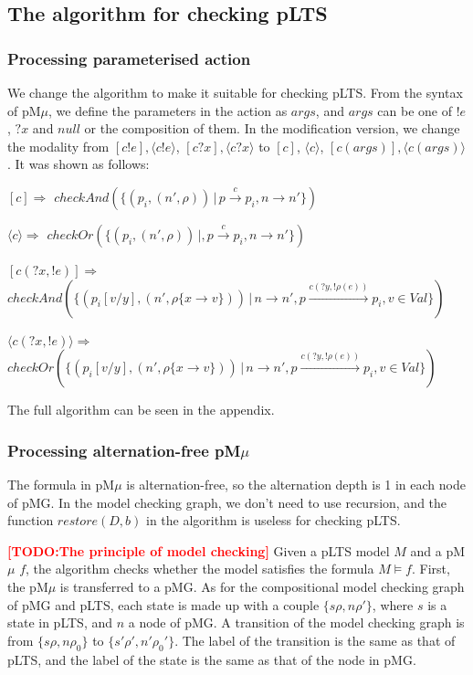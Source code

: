 \documentclass[runningheads,a4paper]{llncs}
\newcommand{\TODO}[1]{\textcolor{red}{\textbf{[TODO:#1]}}}
\begin{document}
\subsection{The algorithm for checking pLTS}


\subsubsection{Processing parameterised action}
We change the algorithm to make it suitable for checking pLTS. From the syntax of pM$\mu$, we define the parameters in the action as $args$, and $args$ can be one of $!e$, $?x$ and $null$ or the composition of them. In the modification version, we change the modality from $[c!e], \langle c!e\rangle$, $[c?x], \langle c?x\rangle$ to $[c]$, $\langle c\rangle$, $[c(args)], \langle c(args)\rangle$.
It was shown as follows:

$[c]\Rightarrow$ $checkAnd(\{ (p_{i}, (n', \rho))\,|\, p \xrightarrow{c} p_{i}, n\rightarrow n' \})$
		
$\langle c\rangle\Rightarrow$ 
	 $checkOr(\{ (p_{i}, (n',\rho))\,|, p \xrightarrow{c} p_{i}, n \rightarrow n'\})$
		
$[c(?x, !e)]\Rightarrow$
	$ checkAnd(\{ (p_{i}[v/y], (n',\rho\{x \rightarrow v\}))\,|\,  n \rightarrow n', p \xrightarrow{c(?y, !\rho(e)) } p_{i},v\in Val\})$
		
{$\langle c(?x, !e)\rangle\Rightarrow$}
	 $ checkOr(\{ (p_{i}[v/y], (n', \rho\{x \rightarrow v\}))\,|\,  n \rightarrow n', p \xrightarrow{c(?y, !\rho(e))} p_{i},v\in Val\})$
		
The full algorithm can be seen in the appendix.

\subsubsection{Processing alternation-free pM$\mu$}
The formula in pM$\mu$ is alternation-free, so the alternation depth is 1 in each node of pMG. In the model checking graph, we don't need to use recursion, and the function $restore(D, b)$ in the algorithm is useless for checking pLTS.

\TODO{The principle of model checking}
Given a pLTS model $M$ and a pM$\mu$ $f$, the algorithm checks whether the model satisfies the formula $M\models f$. First, the pM$\mu$ is transferred to a pMG. As for the compositional model checking graph of pMG and pLTS, each state is made up with a couple $\{s\rho, n\rho'\}$, where $s$ is a state in pLTS, and $n$ a node of pMG. A transition of the model checking graph is from $\{s\rho, n\rho_{0}\}$ to $\{s'\rho', n'\rho_{0}'\}$.  The label of the transition is the same as that of pLTS, and the label of the state is the same as that of the node in pMG.
\end{document}
